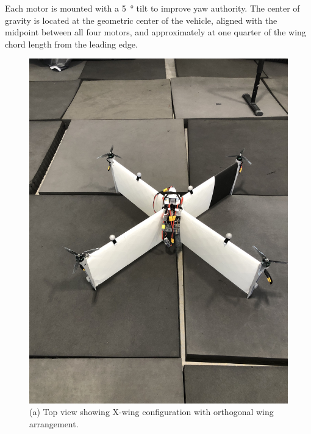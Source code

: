 Each motor is mounted with a \SI{5}{\degree} tilt to improve yaw authority. The center of gravity is located at the geometric center of the vehicle, aligned with the midpoint between all four motors, and approximately at one quarter of the wing chord length from the leading edge.

\begin{figure}[htbp]
\centering
\begin{minipage}[b]{0.48\textwidth}
    \centering
    \includegraphics[width=\textwidth,angle=-90]{figures/drone_hover.jpg}
    \caption*{(a) Top view showing X-wing configuration with orthogonal wing arrangement.}
\end{minipage}
\hfill
\begin{minipage}[b]{0.48\textwidth}
    \centering

\end{minipage}
\end{figure}

